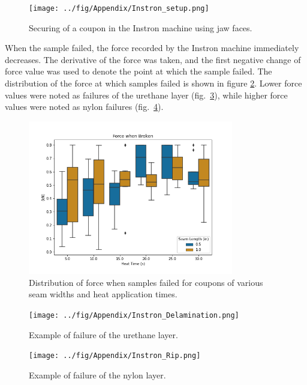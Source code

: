 \documentclass[defaultstyle,11pt]{thesis}
\begin{document}
\begin{figure}
\hypertarget{fig:A1-setup}{%
\centering
\texttt{[image: ../fig/Appendix/Instron\_setup.png]}
\caption{Securing of a coupon in the Instron machine using jaw faces.}\label{fig:A1-setup}
}
\end{figure}

When the sample failed, the force recorded by the Instron machine immediately decreases.
The derivative of the force was taken, and the first negative change of force value was used to denote the point at which the sample failed.
The distribution of the force at which samples failed is shown in figure \ref{fig:A1-results}.
Lower force values were noted as failures of the urethane layer (fig.~\ref{fig:A1-delam}), while higher force values were noted as nylon failures (fig.~\ref{fig:A1-rip}).

\begin{figure}
\hypertarget{fig:A1-results}{%
\centering
\includegraphics[width=0.8\textwidth,height=\textheight]{../fig/Appendix/tensileTest_force.png}
\caption{Distribution of force when samples failed for coupons of various seam widths and heat application times.}\label{fig:A1-results}
}
\end{figure}

\begin{figure}
\hypertarget{fig:A1-delam}{%
\centering
\texttt{[image: ../fig/Appendix/Instron\_Delamination.png]}
\caption{Example of failure of the urethane layer.}\label{fig:A1-delam}
}
\end{figure}

\begin{figure}
\hypertarget{fig:A1-rip}{%
\centering
\texttt{[image: ../fig/Appendix/Instron\_Rip.png]}
\caption{Example of failure of the nylon layer.}\label{fig:A1-rip}
}
\end{figure}
\end{document}

